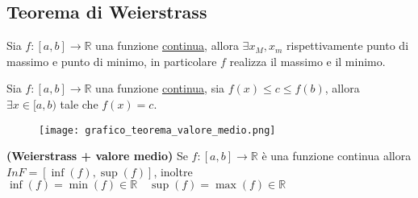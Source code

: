 \documentclass[../main.tex, class=article, 12pt]{subfiles}
\begin{document}
\newpage
\subsection{Teorema di Weierstrass}\label{sec:teorema_di}
\begin{tcolorbox}
        \begin{theorem}
                Sia $ f : [a,b] \to \mathbb{R} $  una funzione \underline{continua}, allora $ \exists x_M, x_m$ rispettivamente punto di massimo e punto di minimo, in particolare $ f $ realizza il massimo e il minimo.
        \end{theorem}
\end{tcolorbox}

\begin{tcolorbox}
       \begin{theorem}
               Sia $ f : [a,b] \to \mathbb{R} $ una funzione \underline{continua}, sia $ f(x) \le c \le f(b) $, allora $ \exists x \in [a, b) $ tale che $ f(x) = c $.
        
       \end{theorem} 
\end{tcolorbox}
        \begin{figure}[h]
          	\texttt{[image: grafico\_teorema\_valore\_medio.png]}
          	\caption{}
                \label{fig:grafico_teorema_valore_medio.png}
        \end{figure}

\begin{tcolorbox}
        \begin{corollario}
                \textbf{(Weierstrass + valore medio)} Se $ f : [a, b] \to \mathbb{R} $ è una funzione continua allora $ InF = [\inf(f), \sup(f)] $, inoltre $ \inf(f) = \min(f) \in \mathbb{R} \quad  \sup(f) = \max(f) \in \mathbb{R}$
        \end{corollario}
\end{tcolorbox}
\end{document}
